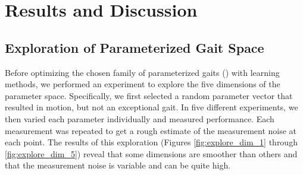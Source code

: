 \section{Results and Discussion}




\subsection{Exploration of Parameterized Gait Space}


Before optimizing the chosen family of
parameterized gaits () with learning methods, we performed an experiment to explore the five dimensions of the parameter space. Specifically, we first selected a random parameter vector that resulted
in motion, but not an exceptional gait. In five different experiments, we then varied each parameter
individually and measured performance.
Each measurement was repeated to get a rough estimate
of the measurement noise at each point.  The results
of this exploration (Figures \ref{fig:explore_dim_1} through
\ref{fig:explore_dim_5}) reveal that some dimensions
are smoother than others and that the measurement noise is variable and can be quite high. 





